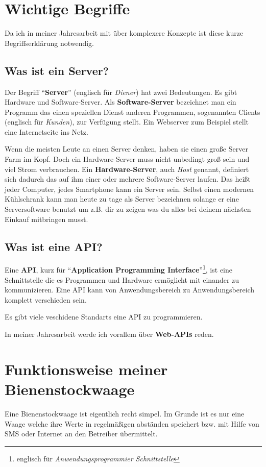 \documentclass[ngerman,12pt]{scrartcl}
\begin{document}
\section{Wichtige Begriffe}
Da ich in meiner Jahresarbeit mit über komplexere Konzepte ist diese kurze Begriffserklärung notwendig.

\subsection{Was ist ein Server?}
Der Begriff \enquote{\textbf{Server}} (englisch für \textit{Diener}) hat zwei Bedeutungen.
Es gibt Hardware und Soft\-ware-Ser\-ver.
Als \textbf{Soft\-ware-Ser\-ver} bezeichnet man ein Programm das einen speziellen Dienst anderen Programmen, sogenannten Clients (englisch für \textit{Kunden}), zur Verfügung stellt.
Ein Webserver zum Beispiel stellt eine Internetseite ins Netz.~\cite[ver.][]{IonosServer}

Wenn die meisten Leute an einen Server denken, haben sie einen große Server Farm im Kopf.
Doch ein Hard\-ware-Ser\-ver muss nicht unbedingt groß sein und viel Strom verbrauchen.
Ein \textbf{Hard\-ware-Ser\-ver}, auch \textit{Host} genannt, definiert sich dadurch das auf ihm einer oder mehrere Soft\-ware-Ser\-ver laufen. Das heißt jeder Computer, jedes Smartphone kann ein Server sein.
Selbst einen modernen Kühlschrank kann man heute zu tage als Server bezeichnen solange er eine Serversoftware benutzt um z.B. dir zu zeigen was du alles bei deinem nächsten Einkauf mitbringen musst.

\subsection{Was ist eine API?}\label{sec:api}

Eine \textbf{API}, kurz für \enquote{\textbf{Application Programming Interface}}\footnote{englisch für \textit{Anwendungsprogrammier Schnittstelle}}, ist eine Schnittstelle die es Programmen und Hardware ermöglicht mit einander zu kommunizieren.
Eine API kann von Anwendungsbereich zu Anwendungsbereich komplett verschieden sein.~\cite{GSApi}


Es gibt viele veschidene Standarts eine API zu programmieren.

In meiner Jahresarbeit werde ich vorallem über \textbf{Web-APIs} reden.

\section{Funktionsweise meiner Bienenstockwaage}
Eine Bienenstockwaage ist eigentlich recht simpel.
Im Grunde ist es nur eine Waage welche ihre Werte in regelmäßigen abständen speichert bzw.
mit Hilfe von SMS oder Internet an den Betreiber übermittelt.
\end{document}
